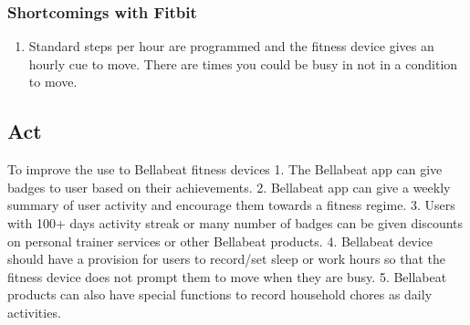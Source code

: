 \documentclass[
]{article}
\providecommand{\tightlist}{%
  \setlength{\itemsep}{0pt}\setlength{\parskip}{0pt}}
\begin{document}
\hypertarget{shortcomings-with-fitbit}{%
\subsubsection{Shortcomings with
Fitbit}\label{shortcomings-with-fitbit}}

\begin{enumerate}
\def\labelenumi{\arabic{enumi}.}
\tightlist
\item
  Standard steps per hour are programmed and the fitness device gives an
  hourly cue to move. There are times you could be busy in not in a
  condition to move.
\end{enumerate}

\hypertarget{act}{%
\subsection{Act}\label{act}}

To improve the use to Bellabeat fitness devices 1. The Bellabeat app can
give badges to user based on their achievements. 2. Bellabeat app can
give a weekly summary of user activity and encourage them towards a
fitness regime. 3. Users with 100+ days activity streak or many number
of badges can be given discounts on personal trainer services or other
Bellabeat products. 4. Bellabeat device should have a provision for
users to record/set sleep or work hours so that the fitness device does
not prompt them to move when they are busy. 5. Bellabeat products can
also have special functions to record household chores as daily
activities.
\end{document}
